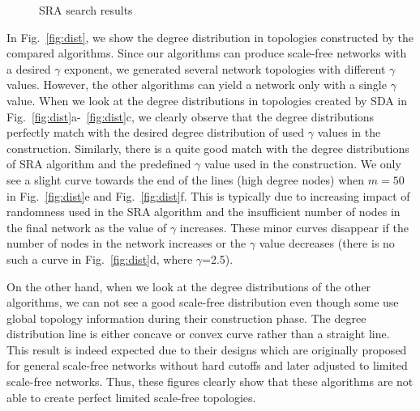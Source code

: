 \documentclass[10pt,journal,cspaper,compsoc]{IEEEtran}
\begin{document}
\begin{figure*}
\centering
{}
\caption{SRA search results}
\label{fig:sra}
\end{figure*}

In Fig.~\ref{fig:dist}, we show the degree distribution in topologies constructed by the compared algorithms. Since our algorithms can produce scale-free networks with a desired $\gamma$ exponent, we generated several network topologies with different $\gamma$ values. However, the other algorithms can yield a network only with a single $\gamma$ value. When we look at the degree distributions in topologies created by SDA in Fig.~\ref{fig:dist}a-~\ref{fig:dist}c, we clearly observe that the degree distributions perfectly match with the desired degree distribution of used $\gamma$ values in the construction. Similarly, there is a quite good match with the degree distributions of SRA algorithm and the predefined $\gamma$ value used in the construction. We only see a slight curve towards the end of the lines (high degree nodes) when $m=50$ in Fig.~\ref{fig:dist}e and Fig.~\ref{fig:dist}f. This is typically due to increasing impact of randomness used in the SRA algorithm and the insufficient number of nodes in the final network as the value of $\gamma$ increases. These minor curves disappear if the number of nodes in the network increases or the $\gamma$ value decreases (there is no such a curve in Fig.~\ref{fig:dist}d, where $\gamma$=2.5).  



On the other hand, when we look at the degree distributions of the other algorithms, we can not see a good scale-free distribution even though some use global topology information during their construction phase. The degree distribution line is either concave or convex curve rather than a straight line. This result is indeed expected due to their designs which are originally proposed for general scale-free networks without hard cutoffs and later adjusted to limited scale-free networks. Thus, these figures clearly show that these algorithms are not able to create perfect limited scale-free topologies.
\end{document}
